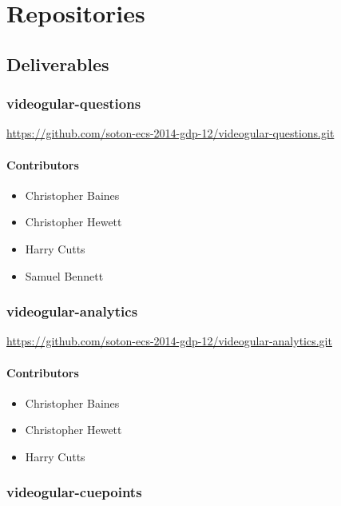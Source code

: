 \chapter{Repositories} \label{Chapter:Repositories}
\section{Deliverables}

\subsection{videogular-questions}
\label{Section:Repo_videogular_questions}

\url{https://github.com/soton-ecs-2014-gdp-12/videogular-questions.git}

\subsubsection{Contributors}
\begin{itemize}
  \item Christopher Baines
  \item Christopher Hewett
  \item Harry Cutts
  \item Samuel Bennett
\end{itemize}

\subsection{videogular-analytics}
\label{Section:Repo_videogular_analytics}

\url{https://github.com/soton-ecs-2014-gdp-12/videogular-analytics.git}

\subsubsection{Contributors}
\begin{itemize}
  \item Christopher Baines
  \item Christopher Hewett
  \item Harry Cutts
\end{itemize}

\subsection{videogular-cuepoints}
\label{Section:Repo_videogular_cuepoints}


